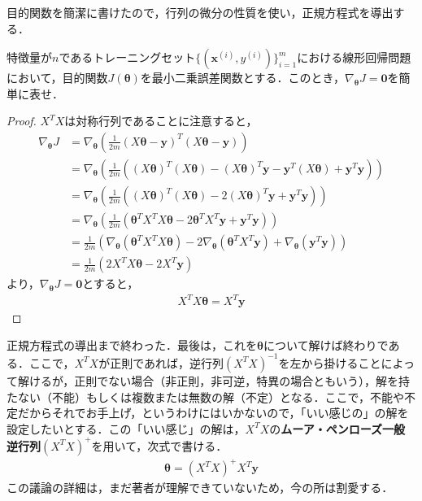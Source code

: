 目的関数を簡潔に書けたので，行列の微分の性質を使い，正規方程式を導出する．
\begin{qu}
特徴量が$n$であるトレーニングセット$\{({\bm x}^{(i)},y^{(i)})\}_{i=1}^m$における線形回帰問題において，目的関数$J({\bm \theta})$を最小二乗誤差関数とする．このとき，$\nabla_{{\bm \theta}}J={\bm 0}$を簡単に表せ．
\end{qu}
\begin{proof}
$X^TX$は対称行列であることに注意すると，
\begin{align*}
\nabla_{{\bm \theta}}J&=\nabla_{{\bm \theta}}\left(\frac{1}{2m}(X{\bm \theta}-{\bm y})^T(X{\bm \theta}-{\bm y})\right) \\
&=\nabla_{{\bm \theta}}\left(\frac{1}{2m}\left((X{\bm \theta})^T(X{\bm \theta})-(X{\bm \theta})^T{\bm y}-{\bm y}^T(X{\bm \theta})+{\bm y}^T{\bm y}\right)\right)\\
&=\nabla_{{\bm \theta}}\left(\frac{1}{2m}\left((X{\bm \theta})^T(X{\bm \theta})-2(X{\bm \theta})^T{\bm y}+{\bm y}^T{\bm y}\right)\right)\\
&=\nabla_{{\bm \theta}}\left(\frac{1}{2m}\left( {\bm \theta}^TX^TX{\bm \theta}-2{\bm \theta}^TX^T{\bm y}+{\bm y}^T{\bm y} \right)\right) \\
&=\frac{1}{2m}\left(\nabla_{{\bm \theta}}({\bm \theta}^TX^TX{\bm \theta})-2\nabla_{{\bm \theta}}({\bm \theta}^TX^T{\bm y})+\nabla_{{\bm \theta}}({\bm y}^T{\bm y})\right)\\
&=\frac{1}{2m}\left(2X^TX{\bm \theta}-2X^T{\bm y}\right)
\end{align*}
より，$\nabla_{{\bm \theta}}J={\bm 0}$とすると，
\begin{align}
X^TX{\bm \theta}=X^T{\bm y}	
\end{align}
\end{proof}

正規方程式の導出まで終わった．最後は，これを${\bm \theta}$について解けば終わりである．ここで，$X^TX$が正則であれば，逆行列$(X^TX)^{-1}$を左から掛けることによって解けるが，正則でない場合（非正則，非可逆，特異の場合ともいう），解を持たない（不能）もしくは複数または無数の解（不定）となる．ここで，不能や不定だからそれでお手上げ，というわけにはいかないので，「いい感じの」の解を設定したいとする．この「いい感じ」の解は，$X^TX$の{\bf ムーア・ペンローズ一般逆行列}$(X^TX)^+$を用いて，次式で書ける．
\begin{align}
{\bm \theta}=(X^TX)^+ X^T{\bm y}
\end{align}
この議論の詳細は，まだ著者が理解できていないため，今の所は割愛する．

